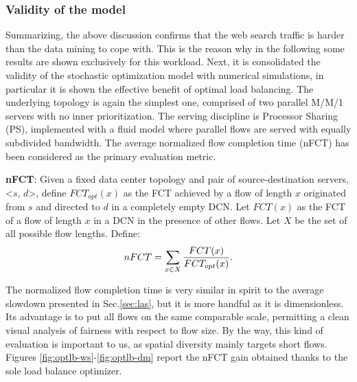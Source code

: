 \subsubsection{Validity of the model}
Summarizing, the above discussion confirms that the web search traffic is harder than the data mining to cope with. This is the reason why in the following some results are shown exclusively for this workload. 
Next, it is consolidated the validity of the stochastic optimization model with numerical simulations, in particular it is shown the effective benefit of optimal load balancing. The underlying topology is again the simplest one, comprised of two parallel M/M/1 servers with no inner prioritization. The serving discipline is Processor Sharing (PS), implemented with a fluid model where parallel flows are served with equally subdivided bandwidth. 
The average normalized flow completion time (nFCT) has been considered as the primary evaluation metric.
\begin{tcolorbox}
	\textbf{nFCT}: Given a fixed data center topology and pair of source-destination servers, <$s$, $d$>, define $FCT_{opt}(x)$ as the FCT achieved by a flow of length $x$ originated from $s$ and directed to $d$ in a completely empty DCN. Let $FCT(x)$ as the FCT of a flow of length $x$ in a DCN in the presence of other flows. Let $X$ be the set of all possible flow lengths. Define:
	\[
	nFCT = \sum_{x \in X} \small \frac{FCT(x)}{FCT_{opt}(x)} \normalsize.
	\]
\end{tcolorbox}
The normalized flow completion time is very similar in spirit to the average slowdown presented in Sec.\ref{sec:las}, but it is more handful as it is dimensionless. Its advantage is to put all flows on the same comparable scale, permitting a clean visual analysis of fairness with respect to flow size. By the way, this kind of evaluation is important to us, as spatial diversity mainly targets short flows. \\
Figures \ref{fig:optlb-ws}-\ref{fig:optlb-dm} report the nFCT gain obtained thanks to the sole load balance optimizer. 
